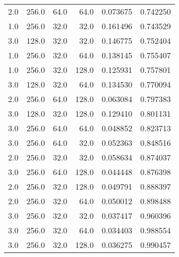 \begin{longtable}{rrrrrr}
        2.0 &     256.0 &        64.0 &     64.0 &      0.073675 &    0.742250 \\
        1.0 &     256.0 &        32.0 &     32.0 &      0.161496 &    0.743529 \\
        3.0 &     128.0 &        32.0 &     32.0 &      0.146775 &    0.752404 \\
        1.0 &     256.0 &        32.0 &     64.0 &      0.138145 &    0.755407 \\
        1.0 &     256.0 &        32.0 &    128.0 &      0.125931 &    0.757801 \\
        3.0 &     128.0 &        32.0 &     64.0 &      0.134530 &    0.770094 \\
        2.0 &     256.0 &        64.0 &    128.0 &      0.063084 &    0.797383 \\
        3.0 &     128.0 &        32.0 &    128.0 &      0.129410 &    0.801131 \\
        3.0 &     256.0 &        64.0 &     64.0 &      0.048852 &    0.823713 \\
        3.0 &     256.0 &        64.0 &     32.0 &      0.052363 &    0.848516 \\
        2.0 &     256.0 &        32.0 &     32.0 &      0.058634 &    0.874037 \\
        3.0 &     256.0 &        64.0 &    128.0 &      0.044448 &    0.876398 \\
        2.0 &     256.0 &        32.0 &    128.0 &      0.049791 &    0.888397 \\
        2.0 &     256.0 &        32.0 &     64.0 &      0.050012 &    0.898488 \\
        3.0 &     256.0 &        32.0 &     32.0 &      0.037417 &    0.960396 \\
        3.0 &     256.0 &        32.0 &     64.0 &      0.034403 &    0.988554 \\
        3.0 &     256.0 &        32.0 &    128.0 &      0.036275 &    0.990457 \\
\end{longtable}
